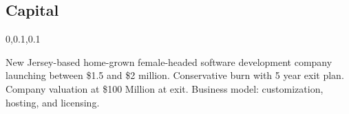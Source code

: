 
\begin{frame}{}
\section{Capital}
\vspace{-.5em}	

{\Large{}\selectfont

\hspace*{20pt}\begin{minipage}{.96\textwidth}
\vspace{4pt}
		
\begin{lightquadblockc}{0,0.1,0.1}{\parbox{21cm}{\centering \vspace{3pt}}}
\begin{center}\begin{minipage}{\textwidth}
{\Huge \setlength{\leftmargini}{30pt}\begin{enumerate}
\dmitem New Jersey-based home-grown female-headed software development company launching  between 
\$1.5 and \$2 million.
\vspace{20pt}
\dmitem Conservative burn with 5 year exit plan.
\vspace{20pt}
\dmitem Company valuation at \$100 Million at exit.
\footnotemark[1]
\vspace{20pt}
\dmitem Business model: customization, hosting, and licensing.
\vspace{20pt}
\footnotemark[2]
\end{enumerate}
}\end{minipage}
\end{center}
\end{lightquadblockc}
\end{minipage}

}

\end{frame}
